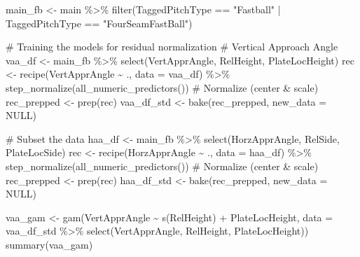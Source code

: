 \documentclass[
  letterpaper,
  DIV=11,
  numbers=noendperiod]{scrartcl}
\newenvironment{Shaded}{\begin{snugshade}}{\end{snugshade}}
\newcommand{\AttributeTok}[1]{\textcolor[rgb]{0.40,0.45,0.13}{#1}}
\newcommand{\CommentTok}[1]{\textcolor[rgb]{0.37,0.37,0.37}{#1}}
\newcommand{\ConstantTok}[1]{\textcolor[rgb]{0.56,0.35,0.01}{#1}}
\newcommand{\FunctionTok}[1]{\textcolor[rgb]{0.28,0.35,0.67}{#1}}
\newcommand{\NormalTok}[1]{\textcolor[rgb]{0.00,0.23,0.31}{#1}}
\newcommand{\OtherTok}[1]{\textcolor[rgb]{0.00,0.23,0.31}{#1}}
\newcommand{\SpecialCharTok}[1]{\textcolor[rgb]{0.37,0.37,0.37}{#1}}
\newcommand{\StringTok}[1]{\textcolor[rgb]{0.13,0.47,0.30}{#1}}
\begin{document}
\begin{Shaded}
\begin{Highlighting}[]
\NormalTok{main\_fb }\OtherTok{\textless{}{-}}\NormalTok{ main }\SpecialCharTok{\%\textgreater{}\%} 
  \FunctionTok{filter}\NormalTok{(TaggedPitchType }\SpecialCharTok{==} \StringTok{"Fastball"} \SpecialCharTok{|}\NormalTok{ TaggedPitchType }\SpecialCharTok{==} \StringTok{"FourSeamFastBall"}\NormalTok{)}

\CommentTok{\# Training the models for residual normalization}
\CommentTok{\# Vertical Approach Angle}
\NormalTok{vaa\_df }\OtherTok{\textless{}{-}}\NormalTok{ main\_fb }\SpecialCharTok{\%\textgreater{}\%}
  \FunctionTok{select}\NormalTok{(VertApprAngle, RelHeight, PlateLocHeight)}
\NormalTok{rec }\OtherTok{\textless{}{-}} \FunctionTok{recipe}\NormalTok{(VertApprAngle }\SpecialCharTok{\textasciitilde{}}\NormalTok{ ., }\AttributeTok{data =}\NormalTok{ vaa\_df) }\SpecialCharTok{\%\textgreater{}\%}
  \FunctionTok{step\_normalize}\NormalTok{(}\FunctionTok{all\_numeric\_predictors}\NormalTok{())     }\CommentTok{\# Normalize (center \& scale)}
\NormalTok{rec\_prepped }\OtherTok{\textless{}{-}} \FunctionTok{prep}\NormalTok{(rec)}
\NormalTok{vaa\_df\_std }\OtherTok{\textless{}{-}} \FunctionTok{bake}\NormalTok{(rec\_prepped, }\AttributeTok{new\_data =} \ConstantTok{NULL}\NormalTok{)}

\CommentTok{\# Subset the data}
\NormalTok{haa\_df }\OtherTok{\textless{}{-}}\NormalTok{ main\_fb }\SpecialCharTok{\%\textgreater{}\%}
  \FunctionTok{select}\NormalTok{(HorzApprAngle, RelSide, PlateLocSide)}
\NormalTok{rec }\OtherTok{\textless{}{-}} \FunctionTok{recipe}\NormalTok{(HorzApprAngle }\SpecialCharTok{\textasciitilde{}}\NormalTok{ ., }\AttributeTok{data =}\NormalTok{ haa\_df) }\SpecialCharTok{\%\textgreater{}\%}
  \FunctionTok{step\_normalize}\NormalTok{(}\FunctionTok{all\_numeric\_predictors}\NormalTok{())     }\CommentTok{\# Normalize (center \& scale)}
\NormalTok{rec\_prepped }\OtherTok{\textless{}{-}} \FunctionTok{prep}\NormalTok{(rec)}
\NormalTok{haa\_df\_std }\OtherTok{\textless{}{-}} \FunctionTok{bake}\NormalTok{(rec\_prepped, }\AttributeTok{new\_data =} \ConstantTok{NULL}\NormalTok{)}
\end{Highlighting}
\end{Shaded}

\begin{Shaded}
\begin{Highlighting}[]
\NormalTok{vaa\_gam }\OtherTok{\textless{}{-}} \FunctionTok{gam}\NormalTok{(VertApprAngle }\SpecialCharTok{\textasciitilde{}} \FunctionTok{s}\NormalTok{(RelHeight) }\SpecialCharTok{+}\NormalTok{ PlateLocHeight, }\AttributeTok{data =}\NormalTok{ vaa\_df\_std }\SpecialCharTok{\%\textgreater{}\%} \FunctionTok{select}\NormalTok{(VertApprAngle, RelHeight, PlateLocHeight))}
\FunctionTok{summary}\NormalTok{(vaa\_gam)}
\end{Highlighting}
\end{Shaded}
\end{document}
